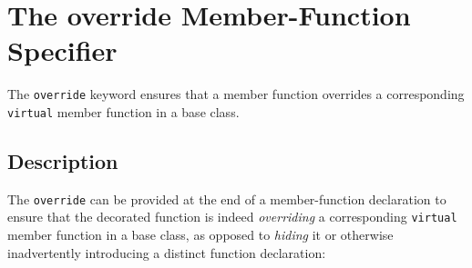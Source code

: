 \newpage
\section[{\tt override}]{The {\SecCode override} Member-Function Specifier}\label{override}

The \lstinline!override! keyword ensures that a member function overrides a corresponding \lstinline!virtual! member function in a base class.

\subsection[Description]{Description}\label{description}

The  \lstinline!override! can be provided at the
end of a member-function declaration to ensure that the decorated
function is indeed \emph{overriding} a corresponding \lstinline!virtual!
member function in a base class, as opposed to \emph{hiding} it or
otherwise inadvertently introducing a distinct function declaration:

